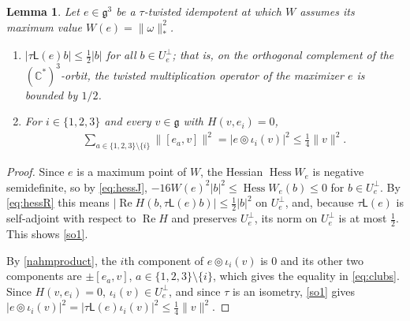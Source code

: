 \documentclass [leqno, 10pt]{amsart}
\newtheorem{lemma}[theorem]{Lemma}%
\theoremstyle{definition}
\numberwithin{equation}{section}
\newcommand{\tmlt}{\circledcirc}
\newcommand{\om}{\omega}
\newcommand{\hess}{\operatorname{Hess}}
\newcommand{\lin}{\mathsf{L}}
\newcommand{\re}{\operatorname{Re}}
\newcommand{\g}{\mathfrak{g}}
\newcommand{\com}{\mathbb C}
\newcommand{\norm}[1]{\lVert #1\rVert}
\newcommand{\nnorm}[1]{\lvert #1\rvert}%
\newcommand{\comass}[1]{\lVert #1\rVert_{\ast}}%
\newcommand{\Usp}{U}
\newcommand{\Uperp}{\Usp^{\perp}}
\begin{document}
\begin{lemma}\label{lem:secondorder}
Let $e\in \g^{3}$ be a $\tau$-twisted idempotent at which $W$ assumes its maximum value $W(e) = \comass{\om}^{2}$.
\begin{enumerate}[label=(\arabic*), ref=(\arabic*)]
\item\label{so1} $\nnorm{\tau\lin(e)b} \leq \tfrac{1}{2}\nnorm{b}$ for all $b \in \Uperp_{e}$; that is, on the orthogonal complement of the $(\com^{\ast})^{3}$-orbit, the twisted multiplication operator of the maximizer $e$ is bounded by $1/2$.
\item\label{so2} For $i \in \{1, 2, 3\}$ and every $v \in \g$ with $H(v, e_{i}) = 0$,
\begin{align}\label{eq:clubs}
\sum_{a \in \{1, 2, 3\} \setminus \{i\}}\norm{[e_{a}, v]}^{2} = \nnorm{e \tmlt \iota_{i}(v)}^{2} \leq \tfrac{1}{4}\norm{v}^{2}.
\end{align}
\end{enumerate}
\end{lemma}
\begin{proof}
Since $e$ is a maximum point of $W$, the Hessian $\hess W_{e}$ is negative semidefinite, so by \eqref{eq:hessJ}, $-16W(e)^{2}\nnorm{b}^{2} \leq \hess W_{e}(b) \leq 0$ for $b \in \Uperp_{e}$. By \eqref{eq:hessR} this means $|\re H(b, \tau\lin(e)b)| \leq \tfrac{1}{2}\nnorm{b}^{2}$ on $\Uperp_{e}$, and, because $\tau\lin(e)$ is self-adjoint with respect to $\re H$ and preserves $\Uperp_{e}$, its norm on $\Uperp_{e}$ is at most $\tfrac{1}{2}$.
This shows \ref{so1}.

By \eqref{nahmproduct}, the $i$th component of $e \tmlt \iota_{i}(v)$ is $0$ and its other two components are $\pm[e_{a}, v]$, $a \in \{1, 2, 3\}\setminus\{i\}$, which gives the equality in \eqref{eq:clubs}. Since $H(v, e_{i}) = 0$, $\iota_{i}(v) \in \Uperp_{e}$, and since $\tau$ is an isometry, \ref{so1} gives $\nnorm{e \tmlt \iota_{i}(v)}^{2} = \nnorm{\tau\lin(e)\iota_{i}(v)}^{2} \leq \tfrac{1}{4}\norm{v}^{2}$.
\end{proof}
\end{document}
